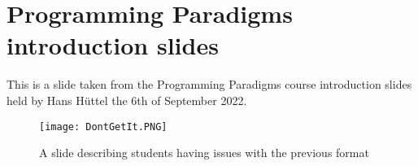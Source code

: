 \chapter{Programming Paradigms introduction slides} \label{chap:PP-intro}
This is a slide taken from the Programming Paradigms course introduction slides held by Hans Hüttel the 6th of September 2022.

\begin{figure}[H]
	\texttt{[image: DontGetIt.PNG]}
	\centering
	\caption{A slide describing students having issues with the previous format}
	\label{fig:PP-intro}
\end{figure}
